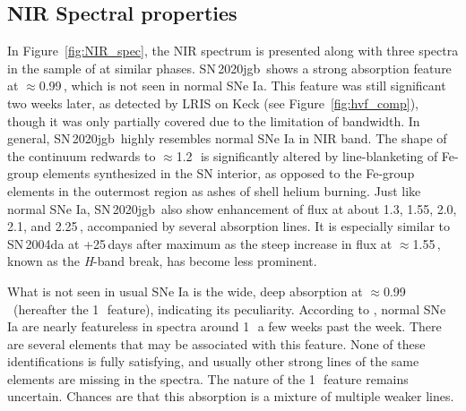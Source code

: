 \documentclass[twocolumn]{aastex631}
\newcommand{\sn}{SN\,2020jgb}
\begin{document}
\subsection{NIR Spectral properties}
\label{sec:NIR_spec}
In Figure~\ref{fig:NIR_spec}, the NIR spectrum is presented along with three spectra in the sample of \cite{Marion2009_NIR} at similar phases. \sn\ shows a strong absorption feature at $\approx$0.99\,\micron, which is not seen in normal SNe Ia. This feature was still significant two weeks later, as detected by LRIS on Keck (see Figure~\ref{fig:hvf_comp}), though it was only partially covered due to the limitation of bandwidth. In general, \sn\ highly resembles normal SNe Ia in NIR band. The shape of the continuum redwards to $\approx$1.2\,\micron\ is significantly altered by line-blanketing of Fe-group elements synthesized in the SN interior, as opposed to the Fe-group elements in the outermost region as ashes of shell helium burning. Just like normal SNe Ia, \sn\ also show enhancement of flux at about 1.3, 1.55, 2.0, 2.1, and 2.25\,\micron, accompanied by several  absorption lines. It is especially similar to SN\,2004da at +25\,days after maximum as the steep increase in flux at $\approx$1.55\,\micron, known as the \textit H-band break, has become less prominent. %

What is not seen in usual SNe Ia is the wide, deep absorption at $\approx$0.99\,\micron\ (hereafter the 1\,\micron\ feature), indicating its peculiarity. According to \citet{Marion2009_NIR}, normal SNe Ia are nearly featureless in spectra around 1\,\micron\ a few weeks past the week. There are several elements that may be associated with this feature. None of these identifications is fully satisfying, and usually other strong lines of the same elements are missing in the spectra. The nature of the 1\,\micron\ feature remains uncertain. Chances are that this absorption is a mixture of multiple weaker lines.
\end{document}

